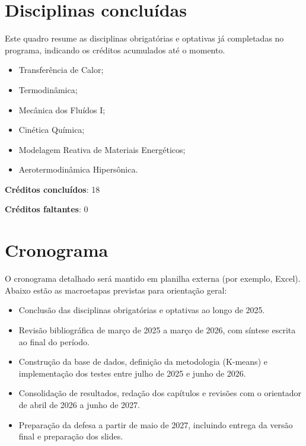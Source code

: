 \documentclass[12pt]{article}
\begin{document}
    \section{Disciplinas concluídas}

    Este quadro resume as disciplinas obrigatórias e optativas já completadas no programa,
    indicando os créditos acumulados até o momento.

    \begin{itemize}
        \item Transferência de Calor;

        \item Termodinâmica;

        \item Mecânica dos Fluídos I;

        \item Cinética Química;

        \item Modelagem Reativa de Materiais Energéticos;

        \item Aerotermodinâmica Hipersônica.
    \end{itemize}

    \textbf{Créditos concluídos}: 18

    \textbf{Créditos faltantes}: 0

    \section{Cronograma}

    O cronograma detalhado será mantido em planilha externa (por exemplo, Excel). Abaixo estão
    as macroetapas previstas para orientação geral:

    \begin{itemize}
        \item Conclusão das disciplinas obrigatórias e optativas ao longo de 2025.

        \item Revisão bibliográfica de março de 2025 a março de 2026, com síntese escrita ao
        final do período.

        \item Construção da base de dados, definição da metodologia (K-means) e implementação
        dos testes entre julho de 2025 e junho de 2026.

        \item Consolidação de resultados, redação dos capítulos e revisões com o orientador de
        abril de 2026 a junho de 2027.

        \item Preparação da defesa a partir de maio de 2027, incluindo entrega da versão final e
        preparação dos slides.
    \end{itemize}
\end{document}

